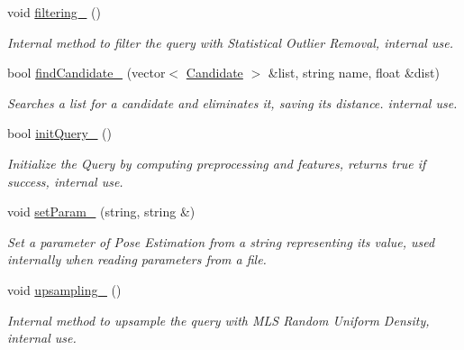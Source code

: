 \begin{DoxyCompactItemize}
void \hyperlink{classPoseEstimation_a6f5385aeeb2d04daf96dee1ba6413940}{filtering\-\_\-} ()
\begin{DoxyCompactList}\small\item\em Internal method to filter the query with Statistical Outlier Removal, internal use. \end{DoxyCompactList}\item 
bool \hyperlink{classPoseEstimation_a6929da76653b0e205677f2e0ec0c1bb2}{find\-Candidate\-\_\-} (vector$<$ \hyperlink{classCandidate}{Candidate} $>$ \&list, string name, float \&dist)
\begin{DoxyCompactList}\small\item\em Searches a list for a candidate and eliminates it, saving its distance. internal use. \end{DoxyCompactList}\item 
bool \hyperlink{classPoseEstimation_afdb67b9d580e1b75ef9ce67bde718d24}{init\-Query\-\_\-} ()
\begin{DoxyCompactList}\small\item\em Initialize the Query by computing preprocessing and features, returns true if success, internal use. \end{DoxyCompactList}\item 
void \hyperlink{classPoseEstimation_a91aa6f5acbcbd7df1f2151748b969ced}{set\-Param\-\_\-} (string, string \&)
\begin{DoxyCompactList}\small\item\em Set a parameter of Pose Estimation from a string representing its value, used internally when reading parameters from a file. \end{DoxyCompactList}\item 
void \hyperlink{classPoseEstimation_a4410e44492b7dac4dcd88f4a0cf3a1da}{upsampling\-\_\-} ()
\begin{DoxyCompactList}\small\item\em Internal method to upsample the query with M\-L\-S Random Uniform Density, internal use. \end{DoxyCompactList}\end{DoxyCompactItemize}
